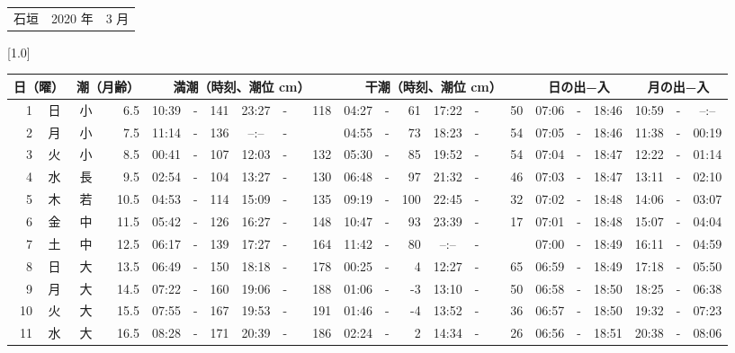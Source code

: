 \documentclass[12pt,a4j]{jsarticle}
\begin{document}
 \begin{table}[htbp]
 \begin{center}
 \begin{tabular}{lcc}
 \LARGE{石垣}  & \large{2020 年} & \large{ 3 月} \\
 \end{tabular}
 \end{center}
 \begin{center}
    \scalebox{0.7}[1.0]{
    \begin{tabular}{|rc|cr|ccrccr|ccrccr|ccc|ccc|}
    \hline
    \multicolumn{2}{|c|}{日（曜）} & \multicolumn{2}{c|}{潮（月齢）} & \multicolumn{6}{c|}{満潮（時刻、潮位 cm）} & \multicolumn{6}{c|}{干潮（時刻、潮位 cm）} & \multicolumn{3}{c|}{日の出−入} &  \multicolumn{3}{c|}{月の出−入}\\
 \hline
 1 & 日 & 小 &  6.5 &  10:39 &-& 141 &  23:27 &-& 118 &  04:27 &-&  61 &  17:22 &-&  50 & 07:06 & -& 18:46 & 10:59 & -& --:-- \\
 2 & 月 & 小 &  7.5 &  11:14 &-& 136 &  --:-- &-&~~~~~ &  04:55 &-&  73 &  18:23 &-&  54 & 07:05 & -& 18:46 & 11:38 & -& 00:19 \\
 3 & 火 & 小 &  8.5 &  00:41 &-& 107 &  12:03 &-& 132 &  05:30 &-&  85 &  19:52 &-&  54 & 07:04 & -& 18:47 & 12:22 & -& 01:14 \\
 4 & 水 & 長 &  9.5 &  02:54 &-& 104 &  13:27 &-& 130 &  06:48 &-&  97 &  21:32 &-&  46 & 07:03 & -& 18:47 & 13:11 & -& 02:10 \\
 5 & 木 & 若 & 10.5 &  04:53 &-& 114 &  15:09 &-& 135 &  09:19 &-& 100 &  22:45 &-&  32 & 07:02 & -& 18:48 & 14:06 & -& 03:07 \\
 6 & 金 & 中 & 11.5 &  05:42 &-& 126 &  16:27 &-& 148 &  10:47 &-&  93 &  23:39 &-&  17 & 07:01 & -& 18:48 & 15:07 & -& 04:04 \\
 7 & 土 & 中 & 12.5 &  06:17 &-& 139 &  17:27 &-& 164 &  11:42 &-&  80 &  --:-- &-&~~~~~ & 07:00 & -& 18:49 & 16:11 & -& 04:59 \\
 8 & 日 & 大 & 13.5 &  06:49 &-& 150 &  18:18 &-& 178 &  00:25 &-&   4 &  12:27 &-&  65 & 06:59 & -& 18:49 & 17:18 & -& 05:50 \\
 9 & 月 & 大 & 14.5 &  07:22 &-& 160 &  19:06 &-& 188 &  01:06 &-&  -3 &  13:10 &-&  50 & 06:58 & -& 18:50 & 18:25 & -& 06:38 \\
10 & 火 & 大 & 15.5 &  07:55 &-& 167 &  19:53 &-& 191 &  01:46 &-&  -4 &  13:52 &-&  36 & 06:57 & -& 18:50 & 19:32 & -& 07:23 \\
11 & 水 & 大 & 16.5 &  08:28 &-& 171 &  20:39 &-& 186 &  02:24 &-&   2 &  14:34 &-&  26 & 06:56 & -& 18:51 & 20:38 & -& 08:06 \\

\end{tabular}}
\end{center}
\end{table}
\end{document}
